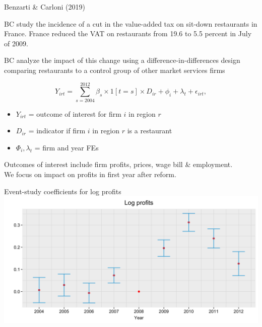 \documentclass[usenames, dvipsnames, aspectratio = 169, 13pt]{beamer}
\newenvironment{wideitemize}{\itemize\addtolength{\itemsep}{10pt}}{\enditemize}
\begin{document}
\begin{frame}{Benzarti \& Carloni (2019)}
\begin{wideitemize}
\item
BC study the incidence of a cut in the value-added tax on sit-down restaurants in France.
France reduced the VAT on restaurants from 19.6 to 5.5 percent in July of 2009. 

\item
BC analyze the impact of this change using a difference-in-differences design comparing restaurants to a control group of other market services firms


\begin{equation}
Y_{irt} = \sum_{s = 2004}^{2012} \beta_s \times 1[t = s] \times  D_{ir} + \phi_i + \lambda_t + \epsilon_{irt} , \label{eqn: bc event-study spec}    
\end{equation}

\noindent \begin{itemize}
    \item $Y_{irt}$ = outcome of interest for firm $i$ in region $r$
    \item $D_{ir}$ = indicator if firm $i$ in region $r$ is a restaurant
    \item $\Phi_i, \lambda_t$ = firm and year FEs
\end{itemize}

\item Outcomes of interest include firm profits, prices, wage bill \& employment.\\
We focus on impact on profits in first year after reform.
\end{wideitemize}
\end{frame}

\begin{frame}{Event-study coefficients for log profits}
    \centering
    \includegraphics[width = 0.8 \textwidth]{Figures/Benzarti-Carloni/profits-event-study.png}
\end{frame}
\end{document}
